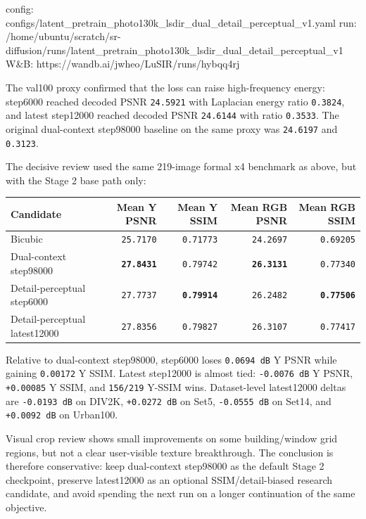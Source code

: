 \documentclass[
  10pt,
]{article}
\newenvironment{Shaded}{}{}
\newcommand{\NormalTok}[1]{#1}
\begin{document}
\begin{Shaded}
\begin{Highlighting}[]
\NormalTok{config: configs/latent\_pretrain\_photo130k\_lsdir\_dual\_detail\_perceptual\_v1.yaml}
\NormalTok{run:    /home/ubuntu/scratch/sr{-}diffusion/runs/latent\_pretrain\_photo130k\_lsdir\_dual\_detail\_perceptual\_v1}
\NormalTok{W\&B:    https://wandb.ai/jwheo/LuSIR/runs/hybqq4rj}
\end{Highlighting}
\end{Shaded}

The val100 proxy confirmed that the loss can raise high-frequency
energy: step6000 reached decoded PSNR \texttt{24.5921} with Laplacian
energy ratio \texttt{0.3824}, and latest step12000 reached decoded PSNR
\texttt{24.6144} with ratio \texttt{0.3533}. The original dual-context
step98000 baseline on the same proxy was \texttt{24.6197} and
\texttt{0.3123}.

The decisive review used the same 219-image formal x4 benchmark as
above, but with the Stage 2 base path only:

\begin{longtable}[]{@{}lrrrr@{}}
\toprule\noalign{}
Candidate & Mean Y PSNR & Mean Y SSIM & Mean RGB PSNR & Mean RGB SSIM \\
\midrule\noalign{}
\endhead
\bottomrule\noalign{}
\endlastfoot
Bicubic & \texttt{25.7170} & \texttt{0.71773} & \texttt{24.2697} &
\texttt{0.69205} \\
Dual-context step98000 & \textbf{\texttt{27.8431}} & \texttt{0.79742} &
\textbf{\texttt{26.3131}} & \texttt{0.77340} \\
Detail-perceptual step6000 & \texttt{27.7737} &
\textbf{\texttt{0.79914}} & \texttt{26.2482} &
\textbf{\texttt{0.77506}} \\
Detail-perceptual latest12000 & \texttt{27.8356} & \texttt{0.79827} &
\texttt{26.3107} & \texttt{0.77417} \\
\end{longtable}

Relative to dual-context step98000, step6000 loses \texttt{0.0694\ dB} Y
PSNR while gaining \texttt{0.00172} Y SSIM. Latest step12000 is almost
tied: \texttt{-0.0076\ dB} Y PSNR, \texttt{+0.00085} Y SSIM, and
\texttt{156/219} Y-SSIM wins. Dataset-level latest12000 deltas are
\texttt{-0.0193\ dB} on DIV2K, \texttt{+0.0272\ dB} on Set5,
\texttt{-0.0555\ dB} on Set14, and \texttt{+0.0092\ dB} on Urban100.

Visual crop review shows small improvements on some building/window grid
regions, but not a clear user-visible texture breakthrough. The
conclusion is therefore conservative: keep dual-context step98000 as the
default Stage 2 checkpoint, preserve latest12000 as an optional
SSIM/detail-biased research candidate, and avoid spending the next run
on a longer continuation of the same objective.
\end{document}
